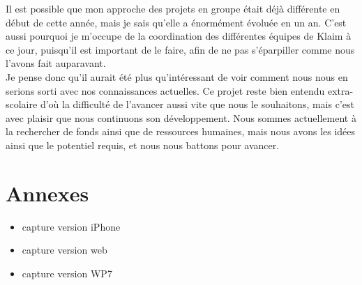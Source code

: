 \documentclass{article}
\begin{document}
		Il est possible que mon approche des projets en groupe était déjà différente en début de cette année, mais je sais qu'elle a énormément évoluée en un an. C'est aussi pourquoi je m'occupe de la coordination des différentes équipes de Klaim à ce jour, puisqu'il est important de le faire, afin de ne pas s'éparpiller comme nous l'avons fait auparavant.\\
		
		Je pense donc qu'il aurait été plus qu'intéressant de voir comment nous nous en serions sorti avec nos connaissances actuelles. Ce projet reste bien entendu extra-scolaire d'où la difficulté de l'avancer aussi vite que nous le souhaitons, mais c'est avec plaisir que nous continuons son développement. Nous sommes actuellement à la rechercher de fonds ainsi que de ressources humaines, mais nous avons les idées ainsi que le potentiel requis, et nous nous battons pour avancer.
	
\newpage	
\section{Annexes}
	\begin{itemize}
		\item capture version iPhone
		\item capture version web
		\item capture version WP7
	\end{itemize}
\end{document}
